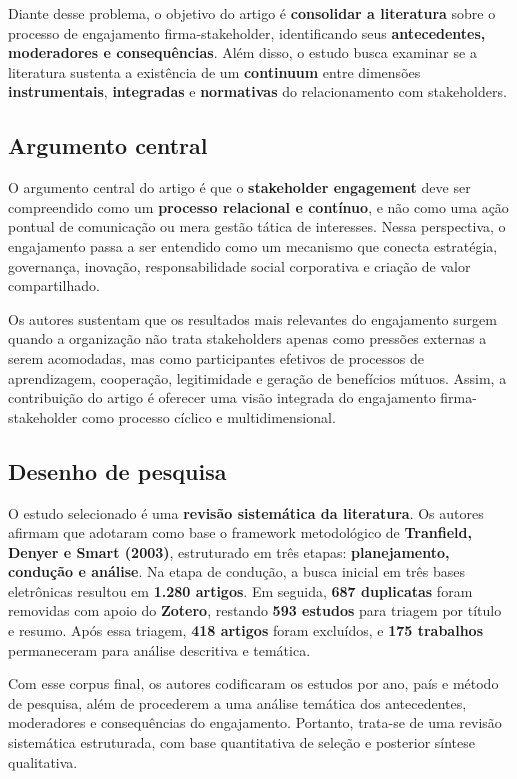 \documentclass[12pt]{article}
\begin{document}
Diante desse problema, o objetivo do artigo é \textbf{consolidar a literatura} sobre o processo de engajamento firma-stakeholder, identificando seus \textbf{antecedentes, moderadores e consequências}. Além disso, o estudo busca examinar se a literatura sustenta a existência de um \textbf{continuum} entre dimensões \textbf{instrumentais}, \textbf{integradas} e \textbf{normativas} do relacionamento com stakeholders.

\subsection{Argumento central}
\label{sec:org90ce413}

O argumento central do artigo é que o \textbf{stakeholder engagement} deve ser compreendido como um \textbf{processo relacional e contínuo}, e não como uma ação pontual de comunicação ou mera gestão tática de interesses. Nessa perspectiva, o engajamento passa a ser entendido como um mecanismo que conecta estratégia, governança, inovação, responsabilidade social corporativa e criação de valor compartilhado.

Os autores sustentam que os resultados mais relevantes do engajamento surgem quando a organização não trata stakeholders apenas como pressões externas a serem acomodadas, mas como participantes efetivos de processos de aprendizagem, cooperação, legitimidade e geração de benefícios mútuos. Assim, a contribuição do artigo é oferecer uma visão integrada do engajamento firma-stakeholder como processo cíclico e multidimensional.

\subsection{Desenho de pesquisa}
\label{sec:org84c156c}

O estudo selecionado é uma \textbf{revisão sistemática da literatura}. Os autores afirmam que adotaram como base o framework metodológico de \textbf{Tranfield, Denyer e Smart (2003)}, estruturado em três etapas: \textbf{planejamento, condução e análise}. Na etapa de condução, a busca inicial em três bases eletrônicas resultou em \textbf{1.280 artigos}. Em seguida, \textbf{687 duplicatas} foram removidas com apoio do \textbf{Zotero}, restando \textbf{593 estudos} para triagem por título e resumo. Após essa triagem, \textbf{418 artigos} foram excluídos, e \textbf{175 trabalhos} permaneceram para análise descritiva e temática.

Com esse corpus final, os autores codificaram os estudos por ano, país e método de pesquisa, além de procederem a uma análise temática dos antecedentes, moderadores e consequências do engajamento. Portanto, trata-se de uma revisão sistemática estruturada, com base quantitativa de seleção e posterior síntese qualitativa.
\end{document}
